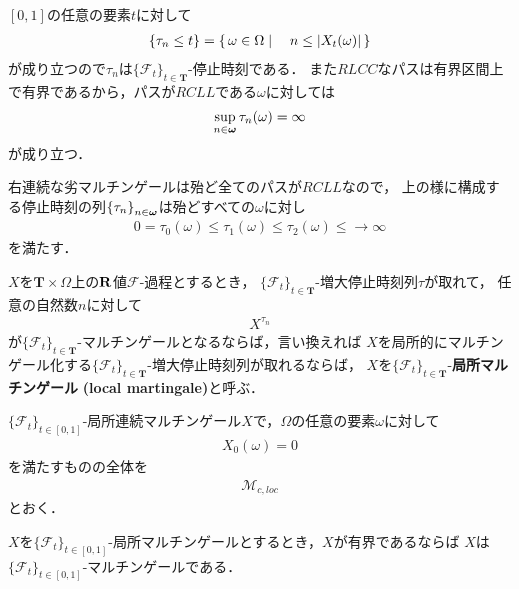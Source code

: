 	\begin{sketch}
		$[0,1]$の任意の要素$t$に対して
		\begin{align}
			\left\{\tau_n \leq t\right\} = \left\{\, \omega \in \Omega \mid \quad n \leq |X_t(\omega)|\, \right\}
		\end{align}
		が成り立つので$\tau_n$は$\{\mathscr{F}_t\}_{t \in \mathbf{T}}$-停止時刻である．
		また$RLCC$なパスは有界区間上で有界であるから，パスが$RCLL$である$\omega$に対しては
		\begin{align}
			\operatorname*{sup}_{n \in {\boldsymbol \omega}} \tau_n(\omega) = \infty
		\end{align}
		が成り立つ．
		\QED
	\end{sketch}
	
	右連続な劣マルチンゲールは殆ど全てのパスが$RCLL$なので，
	上の様に構成する停止時刻の列$\left\{\tau_n\right\}_{n \in {\boldsymbol \omega}}$は殆どすべての$\omega$に対し
	\begin{align}
		0 = \tau_0(\omega) \leq \tau_1(\omega) \leq \tau_2(\omega) \leq \longrightarrow \infty
	\end{align}
	を満たす．
	
	\begin{screen}
		\begin{dfn}[局所マルチンゲール]
			$X$を$\mathbf{T} \times \Omega$上の$\mathbf{R}$値$\mathscr{F}$-過程とするとき，
			$\{\mathscr{F}_{t}\}_{t \in \mathbf{T}}$-増大停止時刻列$\tau$が取れて，
			任意の自然数$n$に対して
			\begin{align}
				X^{\tau_{n}}
			\end{align}
			が$\{\mathscr{F}_{t}\}_{t \in \mathbf{T}}$-マルチンゲールとなるならば，言い換えれば
			$X$を局所的にマルチンゲール化する$\{\mathscr{F}_{t}\}_{t \in \mathbf{T}}$-増大停止時刻列が取れるならば，
			$X$を$\{\mathscr{F}_{t}\}_{t \in \mathbf{T}}$-{\bf 局所マルチンゲール}
			{\bf (local martingale)}と呼ぶ．
		\end{dfn}
	\end{screen}
	
	$\{\mathscr{F}_{t}\}_{t \in [0,1]}$-局所連続マルチンゲール$X$で，$\Omega$の任意の要素$\omega$に対して
	\begin{align}
		X_{0}(\omega) = 0
	\end{align}
	を満たすものの全体を
	\begin{align}
		\mathscr{M}_{c,loc}
	\end{align}
	とおく．
	
	\begin{screen}
		\begin{thm}[有界な局所マルチンゲールはマルチンゲール]
		\label{thm:bounded_local_martingale_is_martingale}
			$X$を$\{\mathscr{F}_{t}\}_{t \in [0,1]}$-局所マルチンゲールとするとき，$X$が有界であるならば
			$X$は$\{\mathscr{F}_{t}\}_{t \in [0,1]}$-マルチンゲールである．
		\end{thm}
	\end{screen}
	
